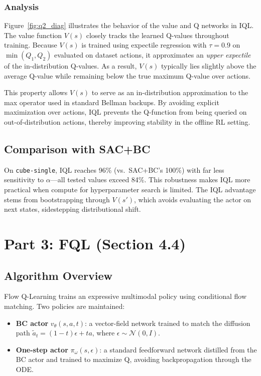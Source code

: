 \documentclass{article}
\begin{document}
\subsubsection{Analysis}
Figure~\ref{fig:q2_diag} illustrates the behavior of the value and Q networks in IQL. The value function $V(s)$ closely tracks the learned Q-values throughout training. Because $V(s)$ is trained using expectile regression with $\tau = 0.9$ on $\min(Q_1,Q_2)$ evaluated on dataset actions, it approximates an \emph{upper expectile} of the in-distribution Q-values. As a result, $V(s)$ typically lies slightly above the average Q-value while remaining below the true maximum Q-value over actions.

This property allows $V(s)$ to serve as an in-distribution approximation to the max operator used in standard Bellman backups. By avoiding explicit maximization over actions, IQL prevents the Q-function from being queried on out-of-distribution actions, thereby improving stability in the offline RL setting.

\subsection{Comparison with SAC+BC}
On \texttt{cube-single}, IQL reaches 96\% (vs.\ SAC+BC's 100\%) with far less sensitivity to $\alpha$---all tested values exceed 84\%. This robustness makes IQL more practical when compute for hyperparameter search is limited. The IQL advantage stems from bootstrapping through $V(s')$, which avoids evaluating the actor on next states, sidestepping distributional shift.

\newpage
\section{Part 3: FQL (Section 4.4)}

\subsection{Algorithm Overview}

Flow Q-Learning \cite{fql} trains an expressive multimodal policy using conditional flow matching. Two policies are maintained:
\begin{itemize}[noitemsep]
  \item \textbf{BC actor} $v_\theta(s, a, t)$: a vector-field network trained to match the diffusion path $\tilde{a}_t = (1-t)\epsilon + ta$, where $\epsilon \sim \mathcal{N}(0,I)$.
  \item \textbf{One-step actor} $\pi_\omega(s, \epsilon)$: a standard feedforward network distilled from the BC actor and trained to maximize Q, avoiding backpropagation through the ODE.
\end{itemize}
\end{document}
